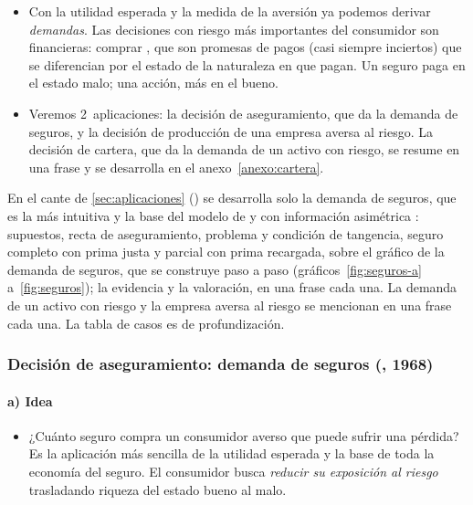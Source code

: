 \documentclass[11pt]{article}
\begin{document}
\begin{itemize}
\item Con la utilidad esperada y la medida de la aversión ya podemos derivar \emph{demandas}. Las decisiones con riesgo más importantes del consumidor son financieras: comprar , que son promesas de pagos (casi siempre inciertos) que se diferencian por el estado de la naturaleza en que pagan. Un seguro paga en el estado malo; una acción, más en el bueno.
\item Veremos 2~aplicaciones: la decisión de aseguramiento, que da la demanda de seguros, y la decisión de producción de una empresa aversa al riesgo. La decisión de cartera, que da la demanda de un activo con riesgo, se resume en una frase y se desarrolla en el anexo~\ref{anexo:cartera}.
\end{itemize}

\begin{notaopositor}
En el cante de \ref{sec:aplicaciones} () se desarrolla solo la demanda de seguros, que es la más intuitiva y la base del modelo de  y  con información asimétrica : supuestos, recta de aseguramiento, problema y condición de tangencia, seguro completo con prima justa y parcial con prima recargada, sobre el gráfico de la demanda de seguros, que se construye paso a paso (gráficos~\ref{fig:seguros-a} a~\ref{fig:seguros}); la evidencia y la valoración, en una frase cada una. La demanda de un activo con riesgo y la empresa aversa al riesgo se mencionan en una frase cada una. La tabla de casos es de profundización.
\end{notaopositor}

\subsubsection{Decisión de aseguramiento: demanda de seguros (, 1968)}\label{sec:seguros}

\paragraph{a) Idea}

\begin{itemize}
\item ¿Cuánto seguro compra un consumidor averso que puede sufrir una pérdida? Es la aplicación más sencilla de la utilidad esperada y la base de toda la economía del seguro\nocite{Mossin1968Aspects,Smith1968Optimal}. El consumidor busca \emph{reducir su exposición al riesgo} trasladando riqueza del estado bueno al malo.
\end{itemize}
\end{document}
